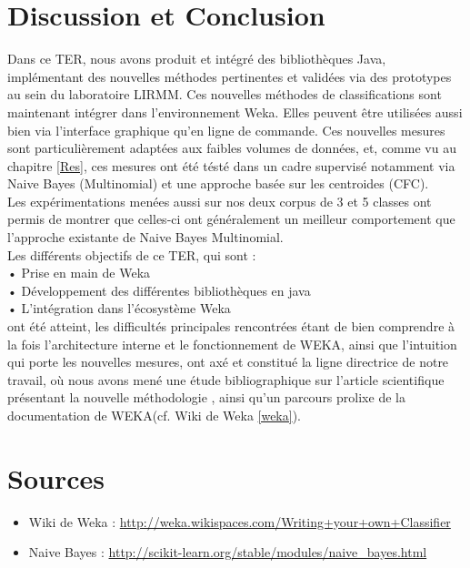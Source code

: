 \documentclass{article}
\begin{document}
\section{Discussion et Conclusion }
Dans ce TER, nous avons produit et intégré des bibliothèques Java, implémentant des nouvelles méthodes pertinentes et validées via des prototypes au sein du laboratoire LIRMM. Ces nouvelles méthodes de classifications sont maintenant intégrer dans l’environnement Weka.
Elles peuvent être utilisées aussi bien via l'interface graphique qu'en ligne de commande. Ces nouvelles mesures sont particulièrement adaptées aux faibles volumes de données, et, comme vu au chapitre \ref{Res}, ces mesures ont été tésté dans un cadre supervisé notamment via Naive Bayes (Multinomial) et une approche basée sur les centroides (CFC). \\
Les expérimentations menées aussi sur nos deux corpus de 3 et 5 classes ont permis de montrer que celles-ci ont généralement un meilleur comportement que l'approche existante de Naive Bayes Multinomial.\\
Les différents objectifs de ce TER, qui sont :\\
• Prise en main de Weka \\
• Développement des différentes bibliothèques en java \\
• L'intégration dans l’écosystème Weka \\
ont été atteint, les difficultés principales rencontrées étant de bien comprendre à la fois l'architecture interne et le fonctionnement de WEKA, ainsi que l'intuition qui porte les nouvelles mesures, ont axé et constitué la ligne directrice de notre travail, où nous avons mené une étude bibliographique sur l'article scientifique présentant la nouvelle méthodologie \cite{RNTIB}, ainsi qu'un parcours prolixe de la documentation de WEKA(cf. Wiki de Weka \ref{weka}).

\newpage
\section{Sources}
\begin{itemize}
\item Wiki de Weka \label{weka}: \href{http://weka.wikispaces.com/Writing+your+own+Classifier}{http://weka.wikispaces.com/Writing+your+own+Classifier}
 \\
\item Naive Bayes  : \href{$http://scikit-learn.org/stable/modules/naive_bayes.html$}{http://scikit-learn.org/stable/modules/naive\_bayes.html}


\end{itemize}



\end{document}
